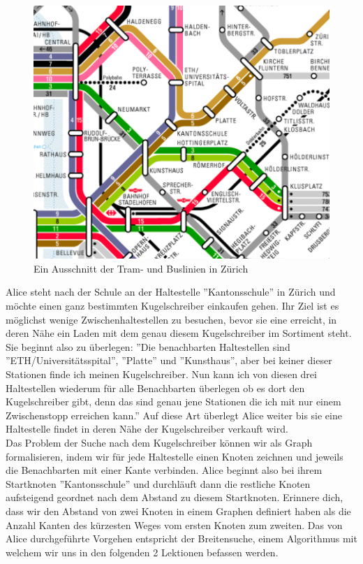 \begin{figure}[h]
    \centering
    \includegraphics[width=\linewidth]{Pictures/Tram1.PNG}
    \caption{Ein Ausschnitt der Tram- und Buslinien in Zürich}
\end{figure}

Alice steht nach der Schule an der Haltestelle ''Kantonsschule'' in Zürich und möchte einen ganz bestimmten Kugelschreiber einkaufen gehen. Ihr Ziel ist es möglichst wenige Zwischenhaltestellen zu besuchen, bevor sie eine erreicht, in deren Nähe ein Laden mit dem genau diesem Kugelschreiber im Sortiment steht. Sie beginnt also zu überlegen: ''Die benachbarten Haltestellen sind\\ ''ETH/Universitätsspital'', ''Platte'' und ''Kunsthaus'', aber bei keiner dieser Stationen finde ich meinen Kugelschreiber. Nun kann ich von diesen drei Haltestellen wiederum für alle Benachbarten überlegen ob es dort den Kugelschreiber gibt, denn das sind genau jene Stationen die ich mit nur einem Zwischenstopp erreichen kann.'' Auf diese Art überlegt Alice weiter bis sie eine Haltestelle findet in deren Nähe der Kugelschreiber verkauft wird. \\

Das Problem der Suche nach dem Kugelschreiber können wir als Graph formalisieren, indem wir für jede Haltestelle einen Knoten zeichnen und jeweils die Benachbarten mit einer Kante verbinden. Alice beginnt also bei ihrem Startknoten ''Kantonsschule'' und durchläuft dann die restliche Knoten aufsteigend geordnet nach dem Abstand zu diesem Startknoten. Erinnere dich, dass wir den Abstand von zwei Knoten in einem Graphen definiert haben als die Anzahl Kanten des kürzesten Weges vom ersten Knoten zum zweiten. Das von Alice durchgeführte Vorgehen entspricht der Breitensuche, einem Algorithmus mit welchem wir uns in den folgenden 2 Lektionen befassen werden.\\

